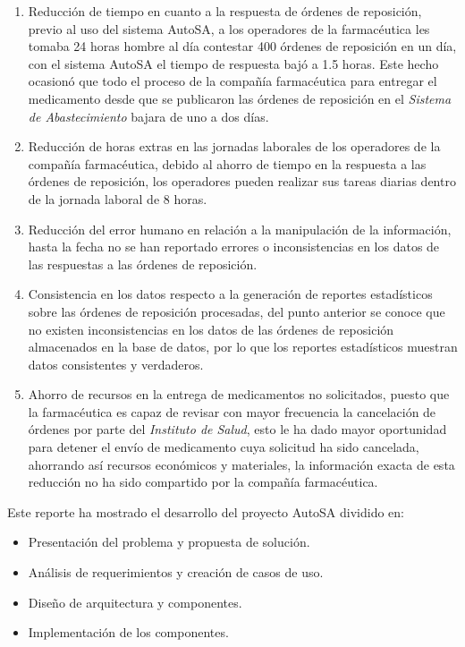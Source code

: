 \begin{enumerate}
	\item Reducción de tiempo en cuanto a la respuesta de órdenes de reposición, previo al uso del sistema AutoSA, a los operadores de la farmacéutica les tomaba 24 horas hombre al día contestar 400 órdenes de reposición en un día, con el sistema AutoSA el tiempo de respuesta bajó a 1.5 horas. Este hecho ocasionó que todo el proceso de la compañía farmacéutica para entregar el medicamento desde que se publicaron las órdenes de reposición en el \textit{Sistema de Abastecimiento} bajara de uno a dos días.
	\item Reducción de horas extras en las jornadas laborales de los operadores de la compañía farmacéutica, debido al ahorro de tiempo en la respuesta a las órdenes de reposición, los operadores pueden realizar sus tareas diarias dentro de la jornada laboral de 8 horas.
	\item Reducción del error humano en relación a la manipulación de la información, hasta la fecha no se han reportado errores o inconsistencias en los datos de las respuestas a las órdenes de reposición.
	\item Consistencia en los datos respecto a la generación de reportes estadísticos sobre las órdenes de reposición procesadas, del punto anterior se conoce que no existen inconsistencias en los datos de las órdenes de reposición almacenados en la base de datos, por lo que los reportes estadísticos muestran datos consistentes y verdaderos.
	\item Ahorro de recursos en la entrega de medicamentos no solicitados, puesto que la farmacéutica es capaz de revisar con mayor frecuencia la cancelación de órdenes por parte del \textit{Instituto de Salud}, esto le ha dado mayor oportunidad para detener el envío de medicamento cuya solicitud ha sido cancelada, ahorrando así recursos económicos y materiales, la información exacta de esta reducción no ha sido compartido por la compañía farmacéutica.
\end{enumerate}
Este reporte ha mostrado el desarrollo del proyecto AutoSA dividido en:
\begin{itemize}
	\item Presentación del problema y propuesta de solución. 
	\item Análisis de requerimientos y creación de casos de uso.
	\item Diseño de arquitectura y componentes.
	\item Implementación de los componentes.
\end{itemize}
